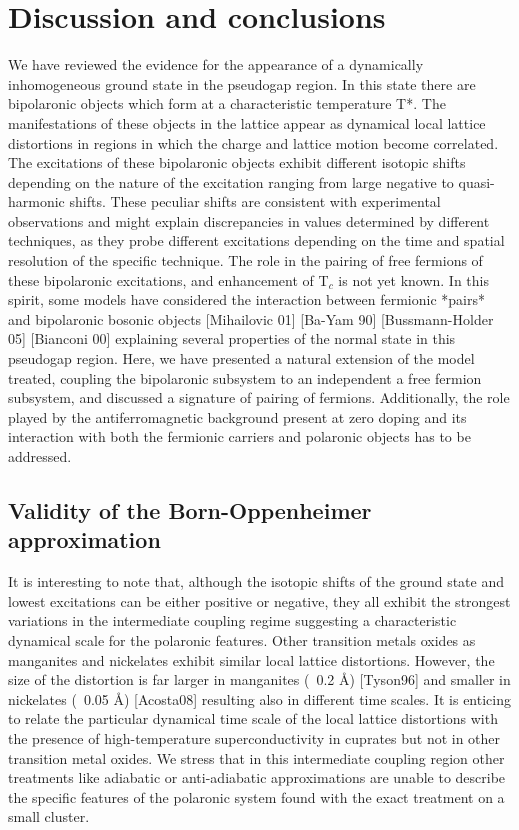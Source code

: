 \chapter{Discussion and conclusions}
\label{chap:conclusions}

We have reviewed the evidence for the appearance of a dynamically inhomogeneous ground state in the pseudogap region. In this state there are bipolaronic objects which form at a characteristic temperature T*. The manifestations of these objects in the lattice appear as dynamical local lattice distortions in regions in which the charge and lattice motion become correlated. The excitations of these bipolaronic objects exhibit different isotopic shifts depending on the nature of the excitation ranging from large negative to quasi-harmonic shifts. These peculiar shifts are consistent with experimental observations and might explain discrepancies in values determined by different techniques, as they probe different excitations depending on the time and spatial resolution of the specific technique. The role in the pairing of free fermions of these bipolaronic excitations, and enhancement of T$_c$ is not yet known. In this spirit, some models have considered the interaction between fermionic *pairs* and bipolaronic bosonic objects [Mihailovic 01] [Ba-Yam 90] [Bussmann-Holder 05] [Bianconi 00] explaining several properties of the normal state in this pseudogap region.  Here, we have presented a natural extension of the model treated,  coupling the bipolaronic subsystem to an independent a free fermion subsystem, and discussed a signature of pairing of fermions. Additionally, the role played by the antiferromagnetic background present at zero doping and its interaction with both the fermionic carriers and polaronic objects has to be addressed.

\section{Validity of the Born-Oppenheimer approximation}

It is interesting to note that, although the isotopic shifts of the ground state and lowest excitations can be either positive or negative, they all exhibit the strongest variations in the intermediate coupling regime suggesting a characteristic dynamical scale for the polaronic features. Other transition metals oxides as manganites and nickelates exhibit similar local lattice distortions.  However, the size of the distortion is far larger in manganites (~0.2 \AA) [Tyson96]  and smaller in nickelates (~0.05 \AA) [Acosta08] resulting also in different time scales. It is enticing to relate the particular dynamical time scale of the local lattice distortions with the presence of high-temperature superconductivity in cuprates but not in other transition metal oxides. We stress that in this intermediate coupling region other treatments like adiabatic or anti-adiabatic approximations are unable to describe the specific features of the polaronic system found with the exact treatment on a small cluster.

